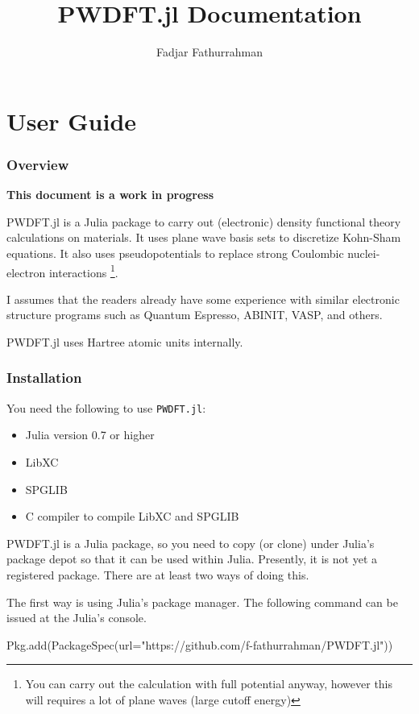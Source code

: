 \documentclass[a4paper,12pt]{article}
\begin{document}
\title{\textsf{PWDFT.jl} Documentation}
\author{Fadjar Fathurrahman}
\maketitle

\tableofcontents

\part{User Guide}

\section{Overview}

\textbf{This document is a work in progress}

\textsf{PWDFT.jl} is a Julia package to carry out (electronic)
density functional theory calculations on materials.
It uses plane wave basis sets to discretize Kohn-Sham equations.
It also uses pseudopotentials to replace strong Coulombic nuclei-electron
interactions \footnote{You can carry out the calculation with
full potential anyway, however this will requires a lot of plane waves (large
cutoff energy)}.

I assumes that the readers already have some experience with similar electronic
structure programs such as Quantum Espresso, ABINIT, VASP, and others.

\textsf{PWDFT.jl} uses Hartree atomic units internally.

\section{Installation}

You need the following to use \texttt{PWDFT.jl}:
\begin{itemize}
\item Julia version 0.7 or higher
\item LibXC
\item SPGLIB
\item C compiler to compile LibXC and SPGLIB
\end{itemize}

\textsf{PWDFT.jl} is a Julia package, so you need to copy (or clone)
under Julia's package depot so that it can be used within Julia.
Presently, it is not yet a registered package. There are at least
two ways of doing this.

The first way is using Julia's package manager. The following command
can be issued at the Julia's console.
\begin{juliacode}
Pkg.add(PackageSpec(url="https://github.com/f-fathurrahman/PWDFT.jl"))
\end{juliacode}
\end{document}
